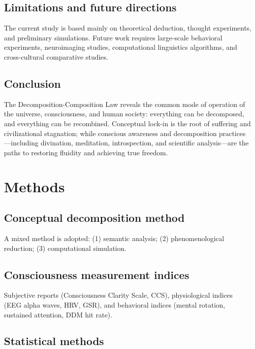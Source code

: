 \documentclass[11pt,a4paper]{article}
\begin{document}
\subsection{Limitations and future directions}

The current study is based mainly on theoretical deduction, thought experiments, and preliminary simulations. Future work requires large-scale behavioral experiments, neuroimaging studies, computational linguistics algorithms, and cross-cultural comparative studies.

\subsection{Conclusion}

The Decomposition-Composition Law reveals the common mode of operation of the universe, consciousness, and human society: everything can be decomposed, and everything can be recombined. Conceptual lock-in is the root of suffering and civilizational stagnation; while conscious awareness and decomposition practices---including divination, meditation, introspection, and scientific analysis---are the paths to restoring fluidity and achieving true freedom.

\section{Methods}

\subsection{Conceptual decomposition method}

A mixed method is adopted: (1) semantic analysis; (2) phenomenological reduction; (3) computational simulation.

\subsection{Consciousness measurement indices}

Subjective reports (Consciousness Clarity Scale, CCS), physiological indices (EEG alpha waves, HRV, GSR), and behavioral indices (mental rotation, sustained attention, DDM hit rate).

\subsection{Statistical methods}
\end{document}
